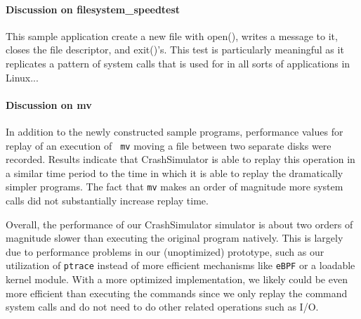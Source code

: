 \paragraph{Discussion on filesystem\_speedtest}

This sample application create a new file with open(), writes a message to it, closes the file descriptor, and
exit()'s. This test is particularly meaningful as it replicates a pattern of system calls that is used for in
all sorts of applications in Linux...

\paragraph{Discussion on mv}

In addition to the newly constructed sample programs, performance values for replay of an execution of {\tt
  mv} moving a file between two separate disks were recorded.  Results indicate that CrashSimulator is able to
replay this operation in a similar time period to the time in which it is able to replay the dramatically
simpler programs.  The fact that {\tt mv} makes an order of magnitude more system calls did not substantially
increase replay time.


Overall, the performance of our CrashSimulator simulator is about two orders of
magnitude slower than executing the original program natively.  This is 
largely due to performance problems in our (unoptimized) prototype, such as
our utilization of {\tt ptrace} instead of more efficient mechanisms like
{\tt eBPF} or a loadable kernel module.  With a more optimized
implementation, we likely could be even more efficient than executing the
commands since we only replay the command system calls and do not need to
do other related operations such as I/O.

